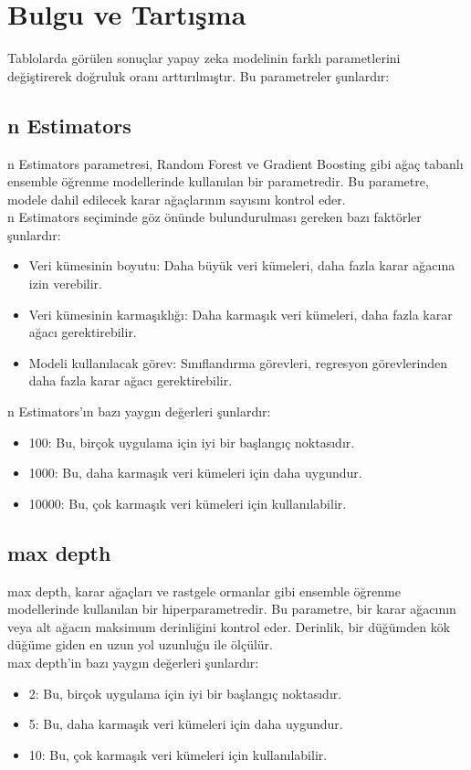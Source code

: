 \documentclass{article}
\begin{document}
 \section{Bulgu ve Tartışma}
  

Tablolarda görülen sonuçlar  yapay zeka modelinin farklı parametlerini değiştirerek doğruluk oranı arttırılmıştır. Bu parametreler şunlardır:
\subsection{n Estimators}
n Estimators parametresi, Random Forest ve Gradient Boosting gibi ağaç tabanlı ensemble öğrenme modellerinde kullanılan bir parametredir. Bu parametre, modele dahil edilecek karar ağaçlarının sayısını kontrol eder.\\
n Estimators seçiminde göz önünde bulundurulması gereken bazı faktörler şunlardır:
\begin{itemize}
    \item Veri kümesinin boyutu: Daha büyük veri kümeleri, daha fazla karar ağacına izin verebilir.
    \item Veri kümesinin karmaşıklığı: Daha karmaşık veri kümeleri, daha fazla karar ağacı gerektirebilir.
    \item Modeli kullanılacak görev: Sınıflandırma görevleri, regresyon görevlerinden daha fazla karar ağacı gerektirebilir.
\end{itemize}
n Estimators'ın bazı yaygın değerleri şunlardır:
\begin{itemize}
    \item 100: Bu, birçok uygulama için iyi bir başlangıç noktasıdır.
     \item 1000: Bu, daha karmaşık veri kümeleri için daha uygundur.
     \item 10000: Bu, çok karmaşık veri kümeleri için kullanılabilir.
\end{itemize}

\subsection{max depth}
max depth, karar ağaçları ve rastgele ormanlar gibi ensemble öğrenme modellerinde kullanılan bir hiperparametredir. Bu parametre, bir karar ağacının veya alt ağacın maksimum derinliğini kontrol eder. Derinlik, bir düğümden kök düğüme giden en uzun yol uzunluğu ile ölçülür.\\
max depth'in bazı yaygın değerleri şunlardır:
\begin{itemize}
    \item 2: Bu, birçok uygulama için iyi bir başlangıç noktasıdır.
    \item 5: Bu, daha karmaşık veri kümeleri için daha uygundur.
     \item 10: Bu, çok karmaşık veri kümeleri için kullanılabilir.
\end{itemize}
    
\end{document}
